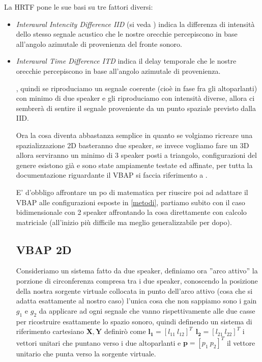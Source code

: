 \documentclass[12pt,a4paper]{report}
\begin{document}
La HRTF pone le sue basi su tre fattori diversi:

\begin{itemize}
\item \textit{Interaural Intencity Difference IID} (si veda \cite{iid}) indica la differenza di intensità dello stesso segnale acustico che le nostre orecchie percepiscono in base all'angolo azimutale di provenienza del fronte sonoro.
\item \textit{Interaural Time  Difference ITD} indica il delay temporale che le nostre orecchie percepiscono in base all'angolo azimutale di provenienza.


, quindi se riproduciamo un segnale coerente (cioè in fase fra gli altoparlanti) con minimo di due speaker e gli riproduciamo con intensità diverse, allora ci sembrerà di sentire il segnale proveniente da un punto spaziale previsto dalla IID.

Ora la cosa diventa abbastanza semplice in quanto se volgiamo ricreare una spazializzazione 2D basteranno due speaker, se invece vogliamo fare un 3D allora serviranno un minimo di 3 speaker posti a triangolo, configurazioni del genere esistono già e sono state ampiamente testate ed affinate, per tutta la documentazione riguardante il VBAP si faccia riferimento a \cite{vbap}.

E' d'obbligo affrontare un po di matematica per riuscire poi ad adattare il VBAP alle configurazioni esposte in \ref{metodi}, partiamo subito con il caso bidimensionale con 2 speaker affrontando la cosa direttamente con calcolo matriciale (all'inizio più difficile ma meglio generalizzabile per dopo).

\subsection{VBAP 2D}\label{c}

Consideriamo un sistema fatto da due speaker, definiamo ora ''arco attivo'' la porzione di circonferenza compresa tra i due speaker, conoscendo la posizione della nostra sorgente virtuale collocata in punto dell'arco attivo (cosa che si adatta esattamente al nostro caso) l'unica cosa che non sappiamo sono i gain $g_1$ e $g_2$ da applicare ad ogni segnale che vanno rispettivamente alle due casse per ricostruire esattamente lo spazio sonoro, quindi definendo un sistema di riferimento cartesiano $ \boldsymbol{X},\boldsymbol{Y}$ definirò come $ \boldsymbol{l_{1}}= {\left[ l_{11} \ l_{12} \right]}^T \ \  \boldsymbol{l_{2}}= {\left[ l_{21} \ l_{22} \right]}^T$ i vettori unitari che puntano verso i due altoparlanti e $\boldsymbol{p}= {\left[ p_1 \ p_2 \right]}^T$ il vettore unitario che punta verso la sorgente virtuale.


\end{itemize}
\end{document}
